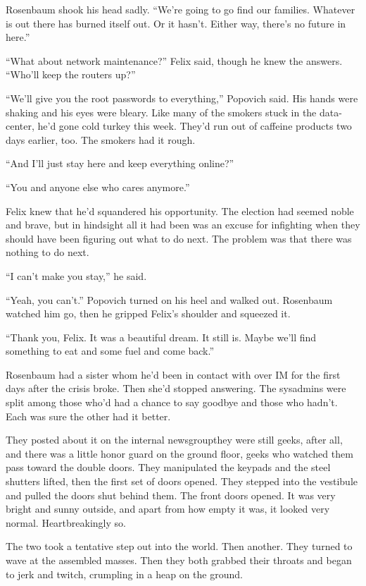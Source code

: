 Rosenbaum shook his head sadly. “We’re going to go find our
families. Whatever is out there has burned itself out. Or it
hasn’t. Either way, there’s no future in here.”

“What about network maintenance?” Felix said, though he knew the
answers. “Who’ll keep the routers up?”

“We’ll give you the root passwords to everything,” Popovich said.
His hands were shaking and his eyes were bleary. Like many of the
smokers stuck in the data-center, he’d gone cold turkey this week.
They’d run out of caffeine products two days earlier, too. The
smokers had it rough.

“And I’ll just stay here and keep everything online?”

“You and anyone else who cares anymore.”

Felix knew that he’d squandered his opportunity. The election had
seemed noble and brave, but in hindsight all it had been was an
excuse for infighting when they should have been figuring out what
to do next. The problem was that there was nothing to do next.

“I can’t make you stay,” he said.

“Yeah, you can’t.” Popovich turned on his heel and walked out.
Rosenbaum watched him go, then he gripped Felix’s shoulder and
squeezed it.

“Thank you, Felix. It was a beautiful dream. It still is. Maybe
we’ll find something to eat and some fuel and come back.”

Rosenbaum had a sister whom he’d been in contact with over IM for
the first days after the crisis broke. Then she’d stopped
answering. The sysadmins were split among those who’d had a chance
to say goodbye and those who hadn’t. Each was sure the other had it
better.

They posted about it on the internal newsgroup\dash{}they were still
geeks, after all, and there was a little honor guard on the ground
floor, geeks who watched them pass toward the double doors. They
manipulated the keypads and the steel shutters lifted, then the
first set of doors opened. They stepped into the vestibule and
pulled the doors shut behind them. The front doors opened. It was
very bright and sunny outside, and apart from how empty it was, it
looked very normal. Heartbreakingly so.

The two took a tentative step out into the world. Then another.
They turned to wave at the assembled masses. Then they both grabbed
their throats and began to jerk and twitch, crumpling in a heap on
the ground.

